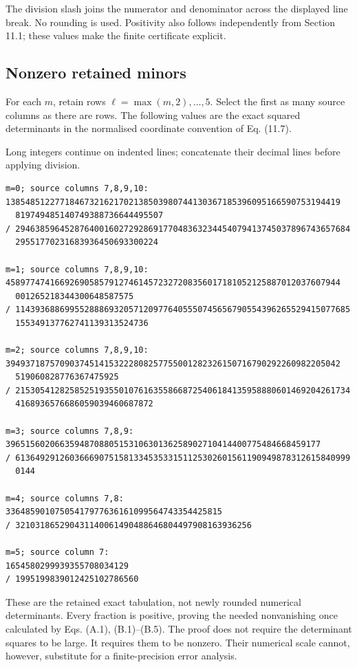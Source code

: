 \documentclass[
  11pt,
  a4paper]{article}
\begin{document}
The division slash joins the numerator and denominator across the displayed line break. No rounding is used. Positivity also follows independently from Section 11.1; these values make the finite certificate explicit.

\hypertarget{b.3-nonzero-retained-minors}{%
\subsection{Nonzero retained minors}\label{b.3-nonzero-retained-minors}}

For each \(m\), retain rows \(\ell=\max(m,2),\ldots,5\). Select the first as many source columns as there are rows. The following values are the exact squared determinants in the normalised coordinate convention of Eq. (11.7).

Long integers continue on indented lines; concatenate their decimal lines before applying division.

\begin{verbatim}
m=0; source columns 7,8,9,10:
13854851227718467321621702138503980744130367185396095166590753194419
  819749485140749388736644495507
/ 29463859645287640016027292869177048363234454079413745037896743657684
  29551770231683936450693300224

m=1; source columns 7,8,9,10:
45897747416692690585791274614572327208356017181052125887012037607944
  001265218344300648587575
/ 11439368869955288869320571209776405550745656790554396265529415077685
  155349137762741139313524736

m=2; source columns 7,8,9,10:
39493718757090374514153222808257755001282326150716790292260982205042
  519060828776367475925
/ 21530541282585251935501076163558668725406184135958880601469204261734
  4168936576686059039460687872

m=3; source columns 7,8,9:
3965156020663594870880515310630136258902710414400775484668459177
/ 61364929126036669075158133453533151125302601561190949878312615840999
  0144

m=4; source columns 7,8:
33648590107505417977636161099564743354425815
/ 321031865290431140061490488646804497908163936256

m=5; source column 7:
1654580299939355708034129
/ 1995199839012425102786560
\end{verbatim}

These are the retained exact tabulation, not newly rounded numerical determinants. Every fraction is positive, proving the needed nonvanishing once calculated by Eqs. (A.1), (B.1)--(B.5). The proof does not require the determinant squares to be large. It requires them to be nonzero. Their numerical scale cannot, however, substitute for a finite-precision error analysis.
\end{document}

